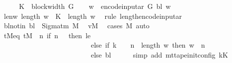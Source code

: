 \begin{isabellebody}
%
\isadelimproof
%
\endisadelimproof
%
\isatagproof
{}\isamarkupfalse%
\ {\isacharminus}{\kern0pt}\isanewline
\ \ \isamarkupfalse%
\ {\isacharquery}{\kern0pt}K\ {\isacharequal}{\kern0pt}\ {\isachardoublequoteopen}block{\isacharunderscore}{\kern0pt}width\ {\isacharquery}{\kern0pt}G{\isachardoublequoteclose}\isanewline
\ \ \isamarkupfalse%
\ {\isacharquery}{\kern0pt}w{\isacharprime}{\kern0pt}\ {\isacharequal}{\kern0pt}\ {\isachardoublequoteopen}encode{\isacharunderscore}{\kern0pt}input{\isacharunderscore}{\kern0pt}ar\ {\isacharquery}{\kern0pt}G\ {\isacharquery}{\kern0pt}bl\ w{\isachardoublequoteclose}\isanewline
\ \ \isamarkupfalse%
\ len{\isacharunderscore}{\kern0pt}w{\isacharprime}{\kern0pt}{\isacharcolon}{\kern0pt}\ {\isachardoublequoteopen}length\ {\isacharquery}{\kern0pt}w{\isacharprime}{\kern0pt}\ {\isacharequal}{\kern0pt}\ {\isacharquery}{\kern0pt}K\ {\isacharasterisk}{\kern0pt}\ length\ w{\isachardoublequoteclose}\ \isamarkupfalse%
\ {\isacharparenleft}{\kern0pt}rule\ length{\isacharunderscore}{\kern0pt}encode{\isacharunderscore}{\kern0pt}input{\isacharunderscore}{\kern0pt}ar{\isacharparenright}{\kern0pt}\isanewline
\ \ \isamarkupfalse%
\ bl{\isacharunderscore}{\kern0pt}notin{\isacharcolon}{\kern0pt}\ {\isachardoublequoteopen}{\isacharquery}{\kern0pt}bl\ {\isasymnotin}\ Sigma{\isacharunderscore}{\kern0pt}tm\ M{\isachardoublequoteclose}\ \isamarkupfalse%
\ vM\ \isamarkupfalse%
\ {\isacharparenleft}{\kern0pt}cases\ M{\isacharparenright}{\kern0pt}\ auto\isanewline
\ \ \isamarkupfalse%
\ tM{\isacharunderscore}{\kern0pt}eq{\isacharcolon}{\kern0pt}\ {\isachardoublequoteopen}{\isacharquery}{\kern0pt}tM\ {\isacharequal}{\kern0pt}\ {\isacharparenleft}{\kern0pt}{\isasymlambda}n{\isachardot}{\kern0pt}\ if\ n\ {\isacharequal}{\kern0pt}\ {}\ then\ {\isacharquery}{\kern0pt}le\isanewline
\ \ \ \ \ \ \ \ \ \ \ \ \ \ \ \ \ \ \ \ \ \ \ \ \ \ else\ if\ k\ {\isacharequal}{\kern0pt}\ {}\ {\isasymand}\ n\ {\isasymle}\ length\ w\ then\ w\ {\isacharbang}{\kern0pt}\ {\isacharparenleft}{\kern0pt}n\ {\isacharminus}{\kern0pt}\ {}{\isacharparenright}{\kern0pt}\isanewline
\ \ \ \ \ \ \ \ \ \ \ \ \ \ \ \ \ \ \ \ \ \ \ \ \ \ else\ {\isacharquery}{\kern0pt}bl{\isacharparenright}{\kern0pt}{\isachardoublequoteclose}\isanewline
\ \ \ \ \isamarkupfalse%
\ {\isacharparenleft}{\kern0pt}simp\ add{\isacharcolon}{\kern0pt}\ mt{\isacharunderscore}{\kern0pt}tape{\isacharunderscore}{\kern0pt}init{\isacharunderscore}{\kern0pt}config\ kK{\isacharparenright}{\kern0pt}\isanewline

\end{isabellebody}
